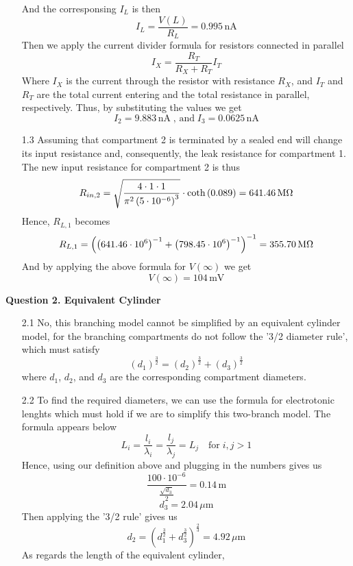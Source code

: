 \documentclass[12pt]{article}
\begin{document}
\begin{enumerate}
    And the corresponsing $I_L$ is then
    $$I_L = \frac{V(L)}{R_{L}} = 0.995 \, \text{nA}$$
    Then we apply the current divider formula for resistors connected in parallel
    $$I_{X} = \frac{R_{T}}{R_{X} + R_{T}}I_{T}$$
    Where $I_{X}$ is the current through the resistor with resistance $R_{X}$, and $I_{T}$ and $R_{T}$ are the total current entering and the total resistance in parallel, respectively.
    Thus, by substituting the values we get\\
    $$I_{2} = 9.883 \, \text{nA} \; \text{, and} \; I_{3} = 0.0625 \, \text{nA}$$
    \item[1.3] Assuming that compartment 2 is terminated by a sealed end will change its input resistance and, consequently, the leak resistance for compartment 1. The new input resistance for compartment 2 is thus
    $$R_{in,2} = \sqrt{\frac{4\cdot 1\cdot 1}{\pi^{2}\left(5\cdot 10^{-6}\right)^{3}}}\cdot \text{coth}\left(0.089\right) = 641.46 \, \text{M\si{\ohm}}$$
    Hence, $R_{L, 1}$ becomes
    $$R_{L,1} = \left(\left(641.46\cdot 10^{6}\right)^{-1} + \left(798.45\cdot 10^{6}\right)^{-1}\right)^{-1} = 355.70 \, \text{M\si{\ohm}}$$
    And by applying the above formula for $V(\infty)$ we get 
    $$V(\infty) = 104 \, \text{mV}$$
\end{enumerate}

\noindent\textbf{Question 2. Equivalent Cylinder}
\begin{enumerate}
    \item[2.1] No, this branching model cannot be simplified by an equivalent cylinder model, for the branching compartments do not follow the 
    '3/2 diameter rule', which must satisfy 
    $$(d_{1})^{\frac{3}{2}} = (d_{2})^{\frac{3}{2}} + (d_{3})^{\frac{3}{2}}$$
    where $d_{1}$, $d_{2}$, and $d_{3}$ are the corresponding compartment diameters.
    \item[2.2] To find the required diameters, we can use the formula for electrotonic lenghts which must hold if we are to simplify this two-branch model.
    The formula appears below  
    $$L_{i} = \frac{l_{i}}{\lambda_{i}} = \frac{l_{j}}{\lambda_{j}} = L_{j} \quad \text{for} \; i, j > 1$$
    Hence, using our definition above and plugging in the numbers gives us
    $$\frac{100\cdot 10^{-6}}{\frac{\sqrt{d_{3}}}{2}} = 0.14 \, \text{m}$$
    $$d_{3} = 2.04 \, \mu \text{m}$$
    Then applying the '3/2 rule' gives us
    $$d_{2} = (d_{1}^{\frac{3}{2}} + d_{3}^{\frac{3}{2}})^{\frac{2}{3}} = 4.92 \, \mu \text{m}$$
    As regards the length of the equivalent cylinder, 


\end{enumerate}
\end{document}
